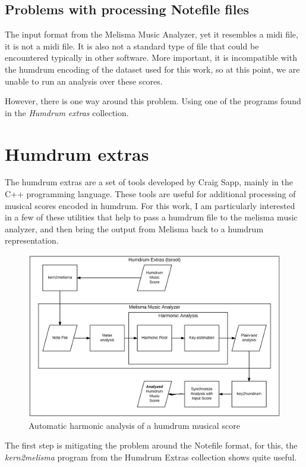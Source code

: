   \subsection{Problems with processing Notefile files}
    The input format from the Melisma Music Analyzer, yet it resembles a midi file, it is not a midi file. It is also not a standard type of file that could be encountered typically in other software. More important, it is incompatible with the humdrum encoding of the dataset used for this work, so at this point, we are unable to run an analysis over these scores.

    However, there is one way around this problem. Using one of the programs found in the \emph{Humdrum extras} collection.

\section{Humdrum extras}
  The humdrum extras are a set of tools developed by Craig Sapp, mainly in the C++ programming language. These tools are useful for additional processing of musical scores encoded in humdrum. For this work, I am particularly interested in a few of these utilities that help to pass a humdrum file to the melisma music analyzer, and then bring the output from Melisma back to a humdrum representation.

  \begin{figure}[ht]
    \centering
      \includegraphics[width=1.0\textwidth]{04-methodology/figures/3}
    \caption{Automatic harmonic analysis of a humdrum musical score}
    \label{fig:software_stack3}
  \end{figure}

  The first step is mitigating the problem around the Notefile format, for this, the \emph{kern2melisma} program from the Humdrum Extras collection shows quite useful.

